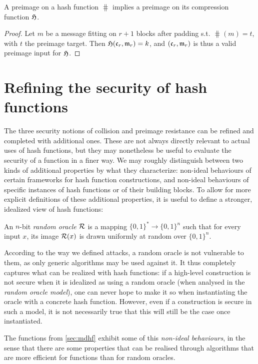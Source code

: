 \begin{prop}
A preimage on a \merkdam hash function $\hash$ implies a preimage on its compression function $\operatorname{\mathfrak{H}}$.
\end{prop}
\begin{proof}
Let $m$ be a message fitting on $r+1$ blocks after padding s.t. $\hash(m) = t$, with $t$ the preimage target.
Then $\operatorname{\mathfrak{H}}(\mathfrak{c}_r, \mathfrak{m}_r) = k$, and $(\mathfrak{c}_r, \mathfrak{m}_r)$ is thus a valid preimage input for $\operatorname{\mathfrak{H}}$.
\end{proof}

\section{Refining the security of hash functions}
\label{sec:refining_md}

The three security notions of collision and preimage resistance can be refined and completed with additional ones. These are not always directly relevant to actual uses of hash functions, but they may nonetheless be useful to evaluate the security
of a function in a finer way. We may roughly distinguish between two kinds of additional properties by what they characterize: non-ideal behaviours of certain frameworks for hash function constructions, and non-ideal
behaviours of specific instances of hash functions or of their building blocks.
To allow for more explicit definitions of these additional properties, it is useful to define a stronger, idealized view of hash functions:

\begin{defi}
An $n$-bit \emph{random oracle} $\operatorname{\mathcal{R}}$ is a mapping $\{0,1\}^* \rightarrow \{0,1\}^n$ such that for every input $x$, its image $\operatorname{\mathcal{R}}(x)$ is drawn uniformly at random over $\{0,1\}^n$.
\end{defi}

According to the way we defined attacks, a random oracle is not vulnerable to them, as only generic algorithms may be used against it. It thus completely captures what
can be realized with hash functions: if a high-level construction is not secure when it is idealized as using a random oracle (when analysed in the \emph{random oracle model}),
one can never hope to make it so when instantiating the oracle with a concrete hash function. However, even if a construction is secure in such a model, it is not necessarily true that
this will still be the case once instantiated.

The \merkdam functions from \autoref{sec:mdhf} exhibit some of this \emph{non-ideal behaviours},
in the sense that there are some properties that can be realised through algorithms that are more efficient for \merkdam functions than for random oracles.

